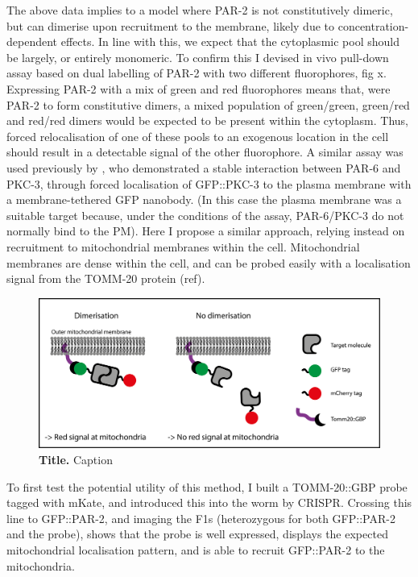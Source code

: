 \documentclass[12pt]{"article"}
\newcommand{\mycaption}[2]{\caption[#1]{\textbf{#1.} #2}}
\begin{document}
The above data implies to a model where PAR-2 is not constitutively dimeric, but can dimerise upon recruitment to the membrane, likely due to concentration-dependent effects. In line with this, we expect that the cytoplasmic pool should be largely, or entirely monomeric. To confirm this I devised in vivo pull-down assay based on dual labelling of PAR-2 with two different fluorophores, fig x. Expressing PAR-2 with a mix of green and red fluorophores means that, were PAR-2 to form constitutive dimers, a mixed population of green/green, green/red and red/red dimers would be expected to be present within the cytoplasm. Thus, forced relocalisation of one of these pools to an exogenous location in the cell should result in a detectable signal of the other fluorophore. A similar assay was used previously by \textcite{Reich2019}, who demonstrated a stable interaction between PAR-6 and PKC-3, through forced localisation of GFP::PKC-3 to the plasma membrane with a membrane-tethered GFP nanobody. (In this case the plasma membrane was a suitable target because, under the conditions of the assay, PAR-6/PKC-3 do not normally bind to the PM). Here I propose a similar approach, relying instead on recruitment to mitochondrial membranes within the cell. Mitochondrial membranes are dense within the cell, and can be probed easily with a localisation signal from the TOMM-20 protein (ref).\\

\begin{figure}[!h]
\includegraphics[scale=0.95]{tomm20_schematic}
\setlength{\abovecaptionskip}{20pt}
\centering
\mycaption{Title}{Caption}
\label{fig:tomm20_schematic}
\end{figure}

To first test the potential utility of this method, I built a TOMM-20::GBP probe tagged with mKate, and introduced this into the worm by CRISPR. Crossing this line to GFP::PAR-2, and imaging the F1s (heterozygous for both GFP::PAR-2 and the probe), shows that the probe is well expressed, displays the expected mitochondrial localisation pattern, and is able to recruit GFP::PAR-2 to the mitochondria.\\
\end{document}
